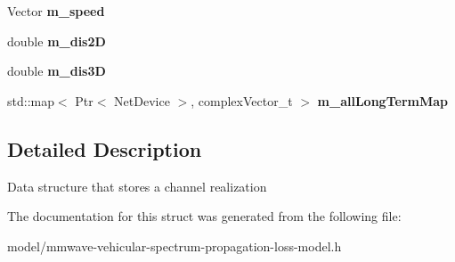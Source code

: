 \begin{DoxyCompactItemize}
\mbox{\label{structns3_1_1millicar_1_1Params3gpp_a929cb38183705e922ab980df470baf5b}} 
Vector {\bfseries m\+\_\+speed}
\item 
\mbox{\label{structns3_1_1millicar_1_1Params3gpp_aff84718a12b5a5a6a946509b86308265}} 
double {\bfseries m\+\_\+dis2D}
\item 
\mbox{\label{structns3_1_1millicar_1_1Params3gpp_abb16b534aee82802771ab2dd478f9a71}} 
double {\bfseries m\+\_\+dis3D}
\item 
\mbox{\label{structns3_1_1millicar_1_1Params3gpp_a4482c840103df226ec88d870475c2813}} 
std\+::map$<$ Ptr$<$ Net\+Device $>$, complex\+Vector\+\_\+t $>$ {\bfseries m\+\_\+all\+Long\+Term\+Map}
\end{DoxyCompactItemize}


\subsection{Detailed Description}
Data structure that stores a channel realization 

The documentation for this struct was generated from the following file\+:\begin{DoxyCompactItemize}
\item 
model/mmwave-\/vehicular-\/spectrum-\/propagation-\/loss-\/model.\+h\end{DoxyCompactItemize}
